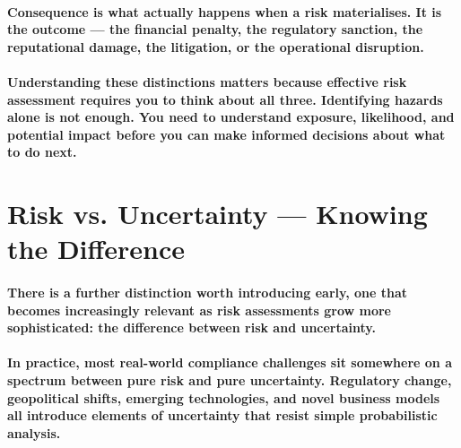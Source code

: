 \paragraph{Consequence is what actually happens when a risk materialises. It is the outcome — the financial penalty, the regulatory sanction, the reputational damage, the litigation, or the operational disruption.}


\paragraph{Understanding these distinctions matters because effective risk assessment requires you to think about all three. Identifying hazards alone is not enough. You need to understand exposure, likelihood, and potential impact before you can make informed decisions about what to do next.}

\newpage
\section{Risk vs. Uncertainty — Knowing the Difference}

\paragraph{There is a further distinction worth introducing early, one that becomes increasingly relevant as risk assessments grow more sophisticated: the difference between risk and uncertainty.}

\begin{itemize}
\end{itemize}

\paragraph{In practice, most real-world compliance challenges sit somewhere on a spectrum between pure risk and pure uncertainty. Regulatory change, geopolitical shifts, emerging technologies, and novel business models all introduce elements of uncertainty that resist simple probabilistic analysis.}

